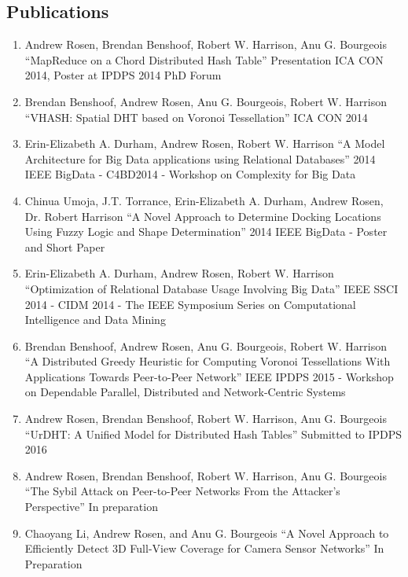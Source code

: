 \documentclass{res}
\begin{document}
\begin{resume}
\section{Publications}
	\begin{enumerate}
	\item Andrew Rosen, Brendan Benshoof, Robert W. Harrison, Anu G. Bourgeois
			``MapReduce on a Chord Distributed Hash Table''
			Presentation ICA CON 2014, Poster at IPDPS 2014 PhD Forum
	\item Brendan Benshoof, Andrew Rosen, Anu G. Bourgeois, Robert W. Harrison
			``VHASH: Spatial DHT based on Voronoi Tessellation''
			ICA CON 2014
	\item  Erin-Elizabeth A. Durham, Andrew Rosen, Robert W. Harrison
    ``A Model Architecture for Big Data applications using Relational Databases''
    2014 IEEE BigData - C4BD2014 - Workshop on Complexity for Big Data
    \item Chinua Umoja, J.T. Torrance, Erin-Elizabeth A. Durham, Andrew Rosen, Dr. Robert Harrison
    	``A Novel Approach to Determine Docking Locations Using Fuzzy Logic and Shape Determination''
    	2014 IEEE BigData - Poster and Short Paper
    \item  Erin-Elizabeth A. Durham, Andrew Rosen, Robert W. Harrison
    ``Optimization of Relational Database Usage Involving Big Data''
     IEEE SSCI 2014 - CIDM 2014 - The IEEE Symposium Series on Computational Intelligence and Data Mining
	\item Brendan Benshoof, Andrew Rosen, Anu G. Bourgeois, Robert W. Harrison
	 ``A Distributed Greedy Heuristic for Computing Voronoi Tessellations With Applications Towards Peer-to-Peer Network''
	IEEE IPDPS 2015 - Workshop on Dependable Parallel, Distributed and Network-Centric Systems
	\item Andrew Rosen, Brendan Benshoof, Robert W. Harrison, Anu G. Bourgeois
	``UrDHT: A Unified Model for Distributed Hash Tables''
	Submitted to IPDPS 2016
	\item Andrew Rosen, Brendan Benshoof, Robert W. Harrison, Anu G. Bourgeois
    ``The Sybil Attack on Peer-to-Peer Networks From the Attacker’s Perspective''
    In preparation
	\item Chaoyang Li, Andrew Rosen,  and Anu G. Bourgeois
        ``A Novel Approach to Efficiently Detect 3D Full-View Coverage for Camera Sensor Networks''
        In Preparation
        
    \end{enumerate}
    

\end{resume}
\end{document}

